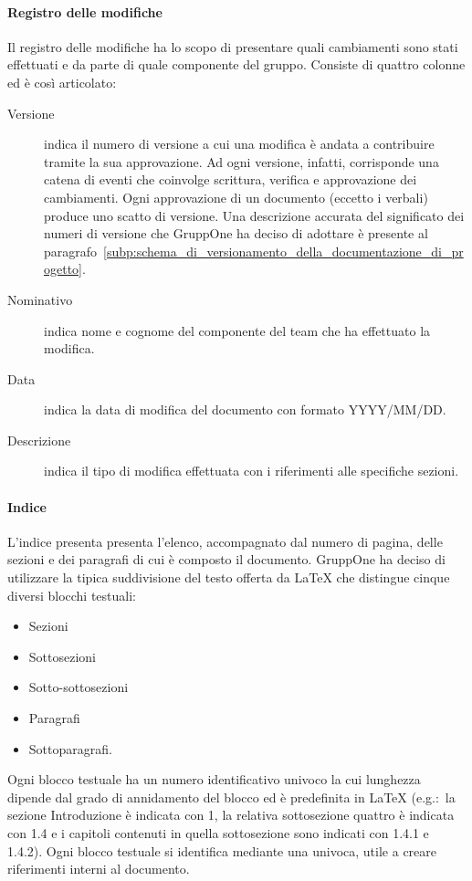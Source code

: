 \documentclass[../../norme-di-progetto.tex]{subfiles}
\begin{document}
\paragraph{Registro delle modifiche}%
\label{par:registro_delle_modifiche}
Il registro delle modifiche ha lo scopo di presentare quali cambiamenti sono stati effettuati e da parte di quale componente del gruppo. Consiste di quattro colonne ed è così articolato:
\begin{description}
  \item [Versione] indica il numero di versione a cui una modifica è andata a contribuire tramite la sua approvazione.
        Ad ogni versione, infatti, corrisponde una catena di eventi che coinvolge scrittura, verifica e approvazione dei cambiamenti.
        Ogni approvazione di un documento (eccetto i verbali) produce uno scatto di versione.
        Una descrizione accurata del significato dei numeri di versione che GruppOne ha deciso di adottare è presente al paragrafo~\ref{subp:schema_di_versionamento_della_documentazione_di_progetto}.
  \item [Nominativo] indica nome e cognome del componente del team che ha effettuato la modifica.
  \item [Data] indica la data di modifica del documento con formato YYYY/MM/DD\@.
  \item [Descrizione] indica il tipo di modifica effettuata con i riferimenti alle specifiche sezioni.
\end{description}

\paragraph{Indice}%
\label{par:indice}
L'indice presenta presenta l'elenco, accompagnato dal numero di pagina, delle sezioni e dei paragrafi di cui è composto il documento.
GruppOne ha deciso di utilizzare la tipica suddivisione del testo offerta da \LaTeX{} che distingue cinque diversi blocchi testuali:
\begin{itemize}
  \item Sezioni
  \item Sottosezioni
  \item Sotto-sottosezioni
  \item Paragrafi
  \item Sottoparagrafi.
\end{itemize}

Ogni blocco testuale ha un numero identificativo univoco la cui lunghezza dipende dal grado di annidamento del blocco ed è predefinita in \LaTeX{} (e.g.:\ la sezione Introduzione è indicata con 1, la relativa sottosezione quattro è indicata con 1.4 e i capitoli contenuti in quella sottosezione sono indicati con 1.4.1 e 1.4.2).
Ogni blocco testuale si identifica mediante una  univoca, utile a creare riferimenti interni al documento.
\end{document}
